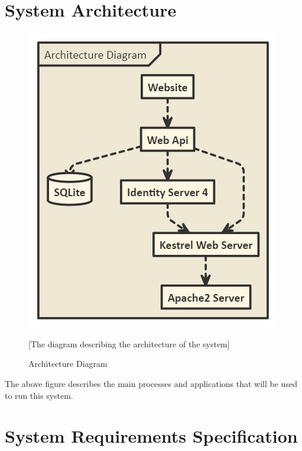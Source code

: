 \documentclass[letterpaper]{article}
\begin{document}
\pagebreak


\section{System Architecture}
\begin{figure}[htbp]
  \includegraphics[scale = .5]{ArchitectureDiagram}
  \caption{Architecture Diagram}[The diagram describing the architecture of the system]
  \centering
\end{figure}
The above figure describes the main processes and applications that will be used to run this system.

\pagebreak

\section{System Requirements Specification}
\end{document}
